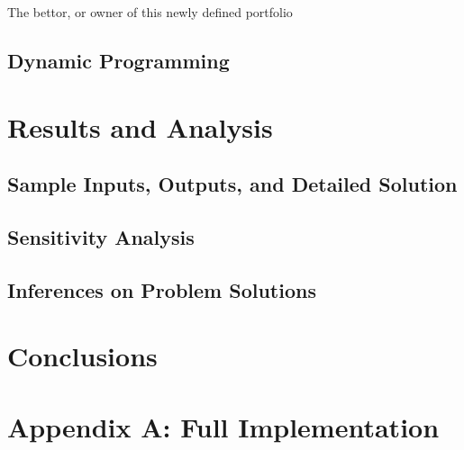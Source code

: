 \documentclass[12pt]{article}
\begin{document}
The bettor, or owner of this newly defined portfolio

\subsection{Dynamic Programming}

\section{Results and Analysis}
\subsection{Sample Inputs, Outputs, and Detailed Solution}


\subsection{Sensitivity Analysis}


\subsection{Inferences on Problem Solutions}

\newpage
\section{Conclusions}


\newpage
\section{Appendix A: Full Implementation}
\end{document}
